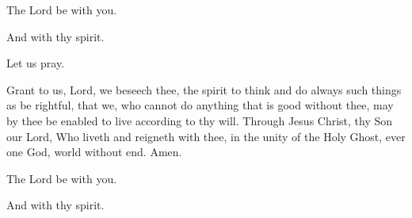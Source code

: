 



\rubric{\Vbar}The Lord be with you.

\rubric{\Rbar}And with thy spirit.

Let us pray.

Grant to us, Lord, we beseech thee, the spirit to think and do always such things as be rightful, that we, who cannot do anything that is good without thee, may by thee be enabled to live according to thy will. Through Jesus Christ, thy Son our Lord, Who liveth and reigneth with thee, in the unity of the Holy Ghost, ever one God, world without end. \rubric{\Rbar} Amen.

\rubric{\Vbar}The Lord be with you.

\rubric{\Rbar}And with thy spirit.